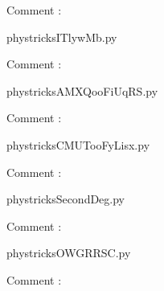    Comment : 

    \clearpage
    


    \newcommand{\CaptionFigITlywMb}{<+Type your caption here+>}
    \begin{center}
        
    \end{center}
    phystricksITlywMb.py

    Comment : 

    \clearpage
    


    \newcommand{\CaptionFigAMXQooFiUqRS}{<+Type your caption here+>}
    \begin{center}
        
    \end{center}
    phystricksAMXQooFiUqRS.py

    Comment : 

    \clearpage
    


    \newcommand{\CaptionFigCMUTooFyLisx}{<+Type your caption here+>}
    \begin{center}
        
    \end{center}
    phystricksCMUTooFyLisx.py

    Comment : 

    \clearpage
    


    \newcommand{\CaptionFigSecondDeg}{<+Type your caption here+>}
    \begin{center}
        
    \end{center}
    phystricksSecondDeg.py

    Comment : 

    \clearpage
    


    \newcommand{\CaptionFigOWGRRSC}{<+Type your caption here+>}
    \begin{center}
        
    \end{center}
    phystricksOWGRRSC.py

    Comment : 

    \clearpage
    


